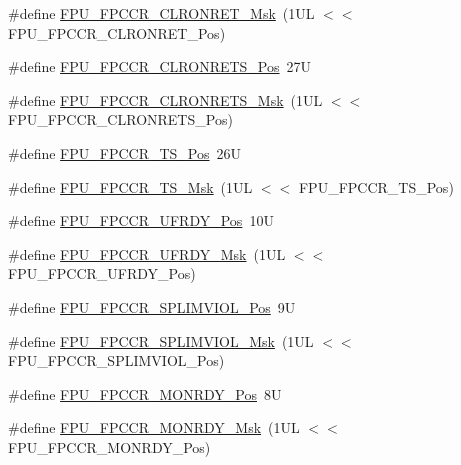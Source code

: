 \begin{DoxyCompactItemize}
\item 
\#define \mbox{\hyperlink{group___c_m_s_i_s___f_p_u_gadedc12ec237657721a613c6f47abed6f}{F\+P\+U\+\_\+\+F\+P\+C\+C\+R\+\_\+\+C\+L\+R\+O\+N\+R\+E\+T\+\_\+\+Msk}}~(1\+U\+L $<$$<$ F\+P\+U\+\_\+\+F\+P\+C\+C\+R\+\_\+\+C\+L\+R\+O\+N\+R\+E\+T\+\_\+\+Pos)
\item 
\#define \mbox{\hyperlink{group___c_m_s_i_s___f_p_u_gabb18ccf9d1b0a4bef3b0823f18eb96ba}{F\+P\+U\+\_\+\+F\+P\+C\+C\+R\+\_\+\+C\+L\+R\+O\+N\+R\+E\+T\+S\+\_\+\+Pos}}~27U
\item 
\#define \mbox{\hyperlink{group___c_m_s_i_s___f_p_u_ga103d932807c15250d96711952878eeb2}{F\+P\+U\+\_\+\+F\+P\+C\+C\+R\+\_\+\+C\+L\+R\+O\+N\+R\+E\+T\+S\+\_\+\+Msk}}~(1\+U\+L $<$$<$ F\+P\+U\+\_\+\+F\+P\+C\+C\+R\+\_\+\+C\+L\+R\+O\+N\+R\+E\+T\+S\+\_\+\+Pos)
\item 
\#define \mbox{\hyperlink{group___c_m_s_i_s___f_p_u_ga624474f408fde177df519460775a74a1}{F\+P\+U\+\_\+\+F\+P\+C\+C\+R\+\_\+\+T\+S\+\_\+\+Pos}}~26U
\item 
\#define \mbox{\hyperlink{group___c_m_s_i_s___f_p_u_ga1377a5dfb4b9c6b18e379ac15e0dc23e}{F\+P\+U\+\_\+\+F\+P\+C\+C\+R\+\_\+\+T\+S\+\_\+\+Msk}}~(1\+U\+L $<$$<$ F\+P\+U\+\_\+\+F\+P\+C\+C\+R\+\_\+\+T\+S\+\_\+\+Pos)
\item 
\#define \mbox{\hyperlink{group___c_m_s_i_s___f_p_u_gac48b42e143b93411977dcb9086a5e4e4}{F\+P\+U\+\_\+\+F\+P\+C\+C\+R\+\_\+\+U\+F\+R\+D\+Y\+\_\+\+Pos}}~10U
\item 
\#define \mbox{\hyperlink{group___c_m_s_i_s___f_p_u_ga97c610927aab580cac3fb166f080b6a6}{F\+P\+U\+\_\+\+F\+P\+C\+C\+R\+\_\+\+U\+F\+R\+D\+Y\+\_\+\+Msk}}~(1\+U\+L $<$$<$ F\+P\+U\+\_\+\+F\+P\+C\+C\+R\+\_\+\+U\+F\+R\+D\+Y\+\_\+\+Pos)
\item 
\#define \mbox{\hyperlink{group___c_m_s_i_s___f_p_u_gac90e551e3cfda27c089bf381acba5aa0}{F\+P\+U\+\_\+\+F\+P\+C\+C\+R\+\_\+\+S\+P\+L\+I\+M\+V\+I\+O\+L\+\_\+\+Pos}}~9U
\item 
\#define \mbox{\hyperlink{group___c_m_s_i_s___f_p_u_gaa5e511cae62f922a9a91af0972f7a5e6}{F\+P\+U\+\_\+\+F\+P\+C\+C\+R\+\_\+\+S\+P\+L\+I\+M\+V\+I\+O\+L\+\_\+\+Msk}}~(1\+U\+L $<$$<$ F\+P\+U\+\_\+\+F\+P\+C\+C\+R\+\_\+\+S\+P\+L\+I\+M\+V\+I\+O\+L\+\_\+\+Pos)
\item 
\#define \mbox{\hyperlink{group___c_m_s_i_s___f_p_u_gae0a4effc79209d821ded517c2be326ba}{F\+P\+U\+\_\+\+F\+P\+C\+C\+R\+\_\+\+M\+O\+N\+R\+D\+Y\+\_\+\+Pos}}~8U
\item 
\#define \mbox{\hyperlink{group___c_m_s_i_s___f_p_u_ga42067729a887081cf56b8fe1029be7a1}{F\+P\+U\+\_\+\+F\+P\+C\+C\+R\+\_\+\+M\+O\+N\+R\+D\+Y\+\_\+\+Msk}}~(1\+U\+L $<$$<$ F\+P\+U\+\_\+\+F\+P\+C\+C\+R\+\_\+\+M\+O\+N\+R\+D\+Y\+\_\+\+Pos)

\end{DoxyCompactItemize}
